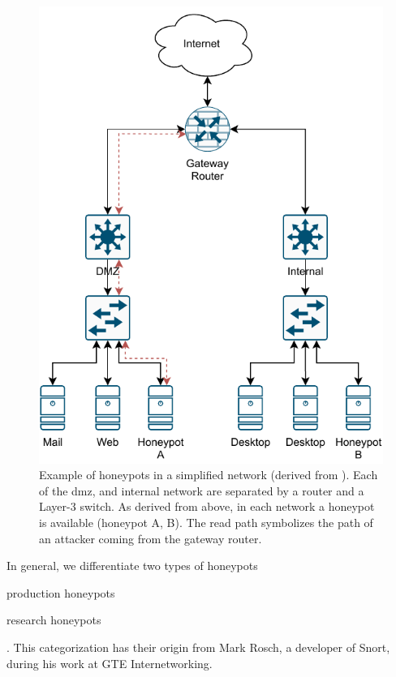 \begin{figure}[ht]
    \centering
    \includegraphics{figures/honeypot-example.pdf}
    \caption[Example of honeypots in a simplified network]{
        Example of honeypots in a simplified network (derived from \cite{Spitzner2003}).
        Each of the \ac{dmz}, and internal network are separated by a router and a Layer-3 switch.
        As derived from above, in each network a honeypot is available (honeypot A, B).
        The read path symbolizes the path of an attacker coming from the gateway router.
    }
    \label{fig:honeypot-example}
\end{figure}

In general, we differentiate two types of honeypots
\begin{enumerate*}[label=(\roman*)]
    \item production honeypots
    \item research honeypots
\end{enumerate*}.
This categorization has their origin from Mark Rosch, a developer of Snort, during his work at GTE Internetworking.

